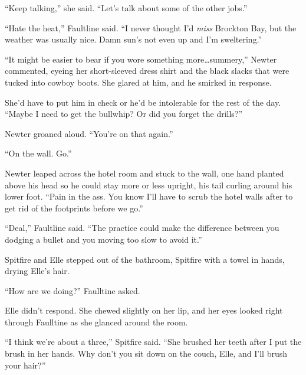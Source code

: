 ``Keep talking,'' she said.  ``Let's talk about some of the other jobs.''



\sectionbreak



``Hate the heat,'' Faultline said.  ``I never thought I'd \emph{miss} Brockton Bay, but the weather was usually nice.  Damn sun's not even up and I'm sweltering.''



``It might be easier to bear if you wore something more\ldots summery,'' Newter commented, eyeing her short-sleeved dress shirt and the black slacks that were tucked into cowboy boots.  She glared at him, and he smirked in response.



She'd have to put him in check or he'd be intolerable for the rest of the day.  ``Maybe I need to get the bullwhip?  Or did you forget the drills?''



Newter groaned aloud.  ``You're on that again.''



``On the wall.  Go.''



Newter leaped across the hotel room and stuck to the wall, one hand planted above his head so he could stay more or less upright, his tail curling around his lower foot.  ``Pain in the ass.  You know I'll have to scrub the hotel walls after to get rid of the footprints before we go.''



``Deal,'' Faultline said.  ``The practice could make the difference between you dodging a bullet and you moving too slow to avoid it.''



Spitfire and Elle stepped out of the bathroom, Spitfire with a towel in hands, drying Elle's hair.



``How are we doing?'' Faulltine asked.



Elle didn't respond.  She chewed slightly on her lip, and her eyes looked right through Faulltine as she glanced around the room.



``I think we're about a three,'' Spitfire said.  ``She brushed her teeth after I put the brush in her hands.  Why don't you sit down on the couch, Elle, and I'll brush your hair?''



